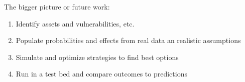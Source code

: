 



The bigger picture or future work:
\begin{enumerate}
\item Identify assets and vulnerabilities, etc.
\item Populate probabilities and effects from real data an realistic assumptions
\item Simulate and optimize strategies to find best options
\item Run in a test bed and compare outcomes to predictions
\end{enumerate} 

